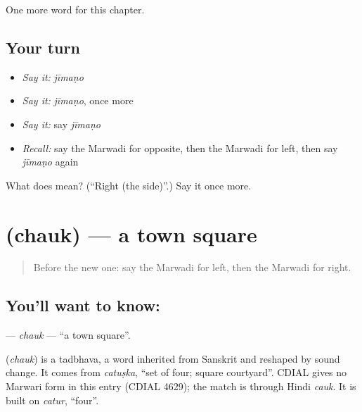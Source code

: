 \begin{grammarlens}[title={What you've built}]
One more word for this chapter.
\end{grammarlens}

\subsection*{Your turn}
\begin{itemize}
\raggedright
  \item \emph{Say it:} \emph{jīmaṇo}
  \item \emph{Say it:} \emph{jīmaṇo}, once more
  \item \emph{Say it:} say \emph{jīmaṇo}
  \item \emph{Recall:} say the Marwadi for opposite, then the Marwadi for left, then say \emph{jīmaṇo} again
\end{itemize}

\begin{tcolorbox}[breakable,colback=teal!4,colframe=teal!35!black,title={Before you move on}]
What does  mean? (\textquotedblleft{}Right (the side)\textquotedblright{}.) Say it once more.
\end{tcolorbox}
\section[\texorpdfstring{\mw{चौक} (chauk)}{चौक (chauk)}]{ (chauk) — a town square}

\label{lesson:MW-C98-chauk}



\begin{quote}
Before the new one: say the Marwadi for left, then the Marwadi for right.
\end{quote}

\subsection*{You'll want to know: }
\textbf{} — \emph{chauk} — \textquotedblleft{}a town square\textquotedblright{}.

\begin{cousinweb}
\textbf{} (\emph{chauk}) is a tadbhava, a word inherited from Sanskrit and reshaped by sound change. It comes from \emph{catuṣka}, \textquotedblleft{}set of four; square courtyard\textquotedblright{}. CDIAL gives no Marwari form in this entry (CDIAL 4629); the match is through Hindi \emph{cauk}. It is built on \emph{catur}, \textquotedblleft{}four\textquotedblright{}.
\end{cousinweb}

